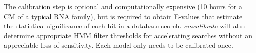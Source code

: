 The calibration step is optional and computationally expensive (10
hours for a CM of a typical RNA family), but is required to obtain
E-values that estimate the statistical significance of each hit in a
database search. \emph{cmcalibrate} will also determine appropriate
HMM filter thresholds for accelerating searches without an appreciable
loss of sensitivity. Each model only needs to be calibrated once.


